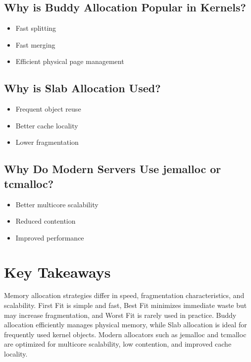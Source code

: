 \subsection{Why is Buddy Allocation Popular in Kernels?}

\begin{itemize}
\item Fast splitting
\item Fast merging
\item Efficient physical page management
\end{itemize}

\subsection{Why is Slab Allocation Used?}

\begin{itemize}
\item Frequent object reuse
\item Better cache locality
\item Lower fragmentation
\end{itemize}

\subsection{Why Do Modern Servers Use jemalloc or tcmalloc?}

\begin{itemize}
\item Better multicore scalability
\item Reduced contention
\item Improved performance
\end{itemize}

\section{Key Takeaways}

\begin{keytakeaways}
Memory allocation strategies differ in speed, fragmentation characteristics, and scalability. First Fit is simple and fast, Best Fit minimizes immediate waste but may increase fragmentation, and Worst Fit is rarely used in practice. Buddy allocation efficiently manages physical memory, while Slab allocation is ideal for frequently used kernel objects. Modern allocators such as jemalloc and tcmalloc are optimized for multicore scalability, low contention, and improved cache locality.
\end{keytakeaways}

